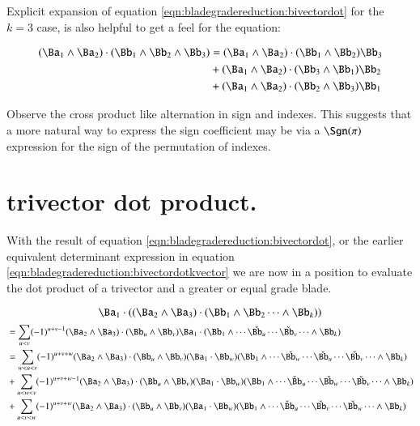 Explicit expansion of equation \ref{eqn:bladegradereduction:bivectordot} for the $k=3$ case, is also helpful to get a feel for
the equation:

\begin{align*}
(\Ba_{1} \wedge \Ba_2) \cdot (\Bb_1 \wedge \Bb_2 \wedge \Bb_3)
&= 
(\Ba_1 \wedge \Ba_2) \cdot (\Bb_1 \wedge \Bb_2) \Bb_3 \\
&+(\Ba_1 \wedge \Ba_2) \cdot (\Bb_3 \wedge \Bb_1) \Bb_2 \\
&+(\Ba_1 \wedge \Ba_2) \cdot (\Bb_2 \wedge \Bb_3) \Bb_1
\end{align*}

Observe the cross product like alternation in sign and indexes.
This suggests that a more natural way to express the sign coefficient may be via a $\Sgn(\pi)$ expression for the sign of the
permutation of indexes.

\section{trivector dot product. }

With the result of equation \ref{eqn:bladegradereduction:bivectordot}, or the earlier equivalent determinant expression in equation 
\ref{eqn:bladegradereduction:bivectordotkvector} we are now in a position to evaluate the dot product of a trivector and a greater or equal grade blade.

\begin{equation*}
\Ba_1 \cdot ((\Ba_{2} \wedge \Ba_3) \cdot (\Bb_1 \wedge \Bb_2 \cdots \wedge \Bb_k))
\end{equation*}
\begin{align*}
&= 
\sum_{u<v} (-1)^{u+v-1} 
(\Ba_2 \wedge \Ba_3) \cdot (\Bb_u \wedge \Bb_v)
\Ba_1 \cdot (\Bb_1 \wedge \cdots \check{\Bb_u} \cdots \check{\Bb_v} \cdots \wedge \Bb_k)  \\
&= 
\sum_{w<u<v} (-1)^{u+v+w} 
(\Ba_2 \wedge \Ba_3) \cdot (\Bb_u \wedge \Bb_v)
(\Ba_1 \cdot \Bb_w) (\Bb_1 \wedge \cdots \check{\Bb_w} \cdots \check{\Bb_u} \cdots \check{\Bb_v} \cdots \wedge \Bb_k)  \\
&+\sum_{u<w<v} (-1)^{u+v+w-1} 
(\Ba_2 \wedge \Ba_3) \cdot (\Bb_u \wedge \Bb_v)
(\Ba_1 \cdot \Bb_w) (\Bb_1 \wedge \cdots \check \Bb_u \cdots \check{\Bb_w} \cdots \check{\Bb_v} \cdots \wedge \Bb_k)  \\
&+\sum_{u<v<w} (-1)^{u+v+w} 
(\Ba_2 \wedge \Ba_3) \cdot (\Bb_u \wedge \Bb_v)
(\Ba_1 \cdot \Bb_w) (\Bb_1 \wedge \cdots \check \Bb_u \cdots \check{\Bb_v} \cdots \check{\Bb_w} \cdots \wedge \Bb_k)  \\
\end{align*}

